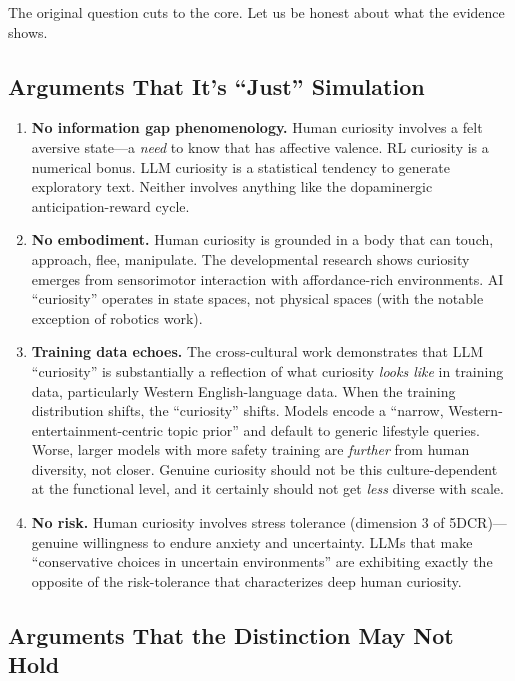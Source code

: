 The original question cuts to the core. Let us be honest about what the evidence shows.

\subsection{Arguments That It's ``Just'' Simulation}\label{subsec:just-simulation}

\begin{enumerate}[leftmargin=*]
  \item \textbf{No information gap phenomenology.} Human curiosity involves a felt aversive state---a \emph{need} to know that has affective valence. RL curiosity is a numerical bonus. LLM curiosity is a statistical tendency to generate exploratory text. Neither involves anything like the dopaminergic anticipation-reward cycle.

  \item \textbf{No embodiment.} Human curiosity is grounded in a body that can touch, approach, flee, manipulate. The developmental research shows curiosity emerges from sensorimotor interaction with affordance-rich environments. AI ``curiosity'' operates in state spaces, not physical spaces (with the notable exception of robotics work).

  \item \textbf{Training data echoes.} The cross-cultural work \citep{borah2025} demonstrates that LLM ``curiosity'' is substantially a reflection of what curiosity \emph{looks like} in training data, particularly Western English-language data. When the training distribution shifts, the ``curiosity'' shifts. Models encode a ``narrow, Western-entertainment-centric topic prior'' and default to generic lifestyle queries. Worse, larger models with more safety training are \emph{further} from human diversity, not closer. Genuine curiosity should not be this culture-dependent at the functional level, and it certainly should not get \emph{less} diverse with scale.

  \item \textbf{No risk.} Human curiosity involves stress tolerance (dimension 3 of 5DCR)---genuine willingness to endure anxiety and uncertainty. LLMs that make ``conservative choices in uncertain environments'' \citep{wang2025} are exhibiting exactly the opposite of the risk-tolerance that characterizes deep human curiosity.
\end{enumerate}

\subsection{Arguments That the Distinction May Not Hold}\label{subsec:distinction-may-not-hold}

